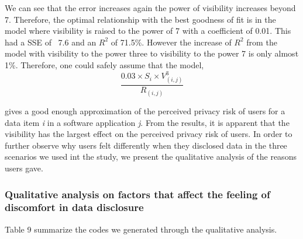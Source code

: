 \documentclass[10pt]{article}
\begin{document}
We can see that the error increases again the power of visibility increases beyond 7. Therefore, the optimal relationship with the best goodness of fit is in the model where visibility is raised to the power of 7 with a coefficient of 0.01. This had a SSE of ~7.6 and an $R^2$ of 71.5\%. However the increase of $R^2$ from the model with visibility to the power three to visibility to the power 7 is only almost 1\%. Therefore, one could safely assume that the model,
\[
\frac{0.03 \times  S_{i} \times V_{(i,j)}^3}{R_{(i,j)}}
\]

gives a good enough approximation of the perceived privacy risk of users for a data item \textit {i} in a software application \textit {j}. From the results, it is apparent that the visibility has the largest effect on the perceived privacy risk of users. In order to further observe why users felt differently when they disclosed data in the three scenarios we used int the study, we present the qualitative analysis of the reasons users gave.

\subsubsection{Qualitative analysis on factors that affect the feeling of discomfort in data disclosure}

Table 9 summarize the codes we generated through the qualitative analysis.
\end{document}
